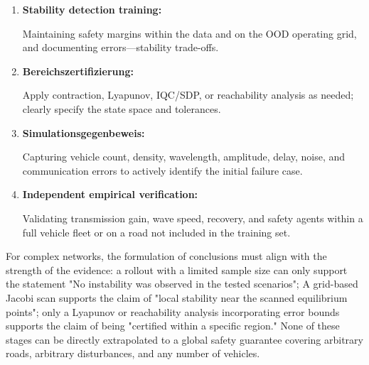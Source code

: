 \documentclass[11pt,a4paper,openany]{book}
\numberwithin{equation}{chapter}
\numberwithin{figure}{chapter}
\numberwithin{table}{chapter}
\begin{document}
\begin{tcolorbox}[keybox,title=\textbf{Nine steps from the learning model to the stability conclusion}]
\begin{enumerate}[leftmargin=1.6em,itemsep=3pt]
\item \textbf{Stability detection training:}






Maintaining safety margins within the data and on the OOD operating grid, and documenting errors—stability trade-offs.









\item \textbf{Bereichszertifizierung:}






Apply contraction, Lyapunov, IQC/SDP, or reachability analysis as needed; clearly specify the state space and tolerances.




\item \textbf{Simulationsgegenbeweis:}






Capturing vehicle count, density, wavelength, amplitude, delay, noise, and communication errors to actively identify the initial failure case.









\item \textbf{Independent empirical verification:}






Validating transmission gain, wave speed, recovery, and safety agents within a full vehicle fleet or on a road not included in the training set.









\end{enumerate}
\end{tcolorbox}












For complex networks, the formulation of conclusions must align with the strength of the evidence: a rollout with a limited sample size can only support the statement "No instability was observed in the tested scenarios"; A grid-based Jacobi scan supports the claim of "local stability near the scanned equilibrium points"; only a Lyapunov or reachability analysis incorporating error bounds supports the claim of being "certified within a specific region." None of these stages can be directly extrapolated to a global safety guarantee covering arbitrary roads, arbitrary disturbances, and any number of vehicles.
\end{document}
